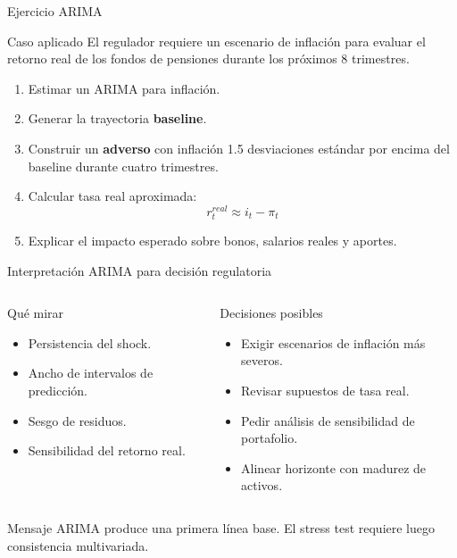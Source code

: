 \documentclass[10pt,aspectratio=169]{beamer}
\newcommand{\baseline}{\textcolor{MacropolTeal}{\textbf{baseline}}}
\newcommand{\adverso}{\textcolor{red!70!black}{\textbf{adverso}}}
\begin{document}
\begin{frame}{Ejercicio ARIMA}
\begin{block}{Caso aplicado}
El regulador requiere un escenario de inflación para evaluar el retorno real de los fondos de pensiones durante los próximos 8 trimestres.
\end{block}

\begin{enumerate}
  \item Estimar un ARIMA para inflación.
  \item Generar la trayectoria \baseline{}.
  \item Construir un \adverso{} con inflación 1.5 desviaciones estándar por encima del baseline durante cuatro trimestres.
  \item Calcular tasa real aproximada:
  \[
  r^{real}_t \approx i_t - \pi_t
  \]
  \item Explicar el impacto esperado sobre bonos, salarios reales y aportes.
\end{enumerate}
\end{frame}

\begin{frame}{Interpretación ARIMA para decisión regulatoria}
\begin{columns}
\begin{block}{Qué mirar}
\begin{itemize}
  \item Persistencia del shock.
  \item Ancho de intervalos de predicción.
  \item Sesgo de residuos.
  \item Sensibilidad del retorno real.
\end{itemize}
\end{block}

\begin{block}{Decisiones posibles}
\begin{itemize}
  \item Exigir escenarios de inflación más severos.
  \item Revisar supuestos de tasa real.
  \item Pedir análisis de sensibilidad de portafolio.
  \item Alinear horizonte con madurez de activos.
\end{itemize}
\end{block}
\end{columns}

\vspace{0.4em}
\begin{block}{Mensaje}
ARIMA produce una primera línea base. El stress test requiere luego consistencia multivariada.
\end{block}
\end{frame}
\end{document}
